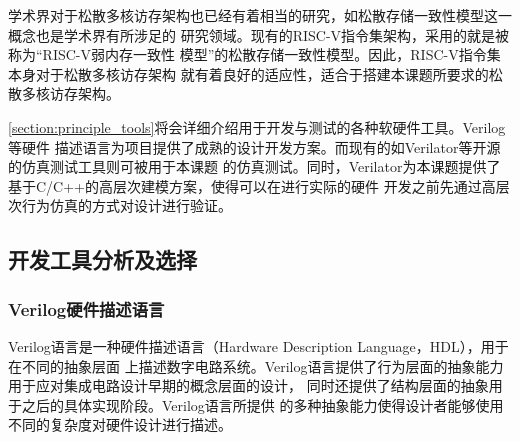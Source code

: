 学术界对于松散多核访存架构也已经有着相当的研究，如松散存储一致性模型这一概念也是学术界有所涉足的
研究领域\cite{adve1996shared}。现有的RISC-V指令集架构，采用的就是被称为“RISC-V弱内存一致性
模型”的松散存储一致性模型\cite{waterman2014risc}。因此，RISC-V指令集本身对于松散多核访存架构
就有着良好的适应性，适合于搭建本课题所要求的松散多核访存架构。

\autoref{section:principle_tools}将会详细介绍用于开发与测试的各种软硬件工具。Verilog等硬件
描述语言为项目提供了成熟的设计开发方案。而现有的如Verilator等开源的仿真测试工具则可被用于本课题
的仿真测试。同时，Verilator为本课题提供了基于C/C++的高层次建模方案，使得可以在进行实际的硬件
开发之前先通过高层次行为仿真的方式对设计进行验证。

\subsection{开发工具分析及选择}
\label{section:principle_tools}

\subsubsection{Verilog硬件描述语言}


Verilog语言是一种硬件描述语言（Hardware Description Language，HDL），用于在不同的抽象层面
上描述数字电路系统。Verilog语言提供了行为层面的抽象能力用于应对集成电路设计早期的概念层面的设计，
同时还提供了结构层面的抽象用于之后的具体实现阶段\cite{thomas2008verilog}。Verilog语言所提供
的多种抽象能力使得设计者能够使用不同的复杂度对硬件设计进行描述。


